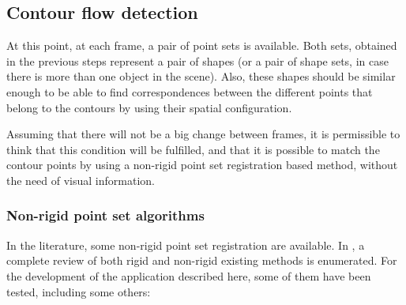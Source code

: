\subsection{Contour flow detection}\label{ch:chapter02_01_02}

At this point, at each frame, a pair of point sets is available. Both sets, obtained in the previous steps represent a 
pair of shapes (or a pair of shape sets, in case there is more than one object in the scene). Also, these shapes should 
be similar enough to be able to find correspondences between the different points that belong to the contours by using 
their spatial configuration. 

Assuming that there will not be a big change between frames, it is permissible to think that this condition will be 
fulfilled, and that it is possible to match the contour points by using a non-rigid point set registration based method, 
without the need of visual information.

\subsubsection{Non-rigid point set algorithms}\label{ch:chapter02_01_02_01}

In the literature, some non-rigid point set registration are available. In \cite{myronenko2010point}, a complete review of both rigid and non-rigid existing methods is enumerated. For the development of the application described here, some of them have been tested, including some others:

